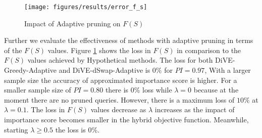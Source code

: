 
\begin{figure}[t]
	\texttt{[image: figures/results/error\_f\_s]}
				\vspace{-15pt}
	\caption{Impact of Adaptive pruning on $F(S)$}
	\label{fig:pruning_performance_swapd}
\end{figure}

Further we evaluate the effectiveness of methods with adaptive pruning in terms of the $F\left(S\right)$ values. 
Figure \ref{fig:pruning_performance_swapd} shows the loss in $F\left(S\right)$ in comparison to the $F\left(S\right)$ values achieved by Hypothetical methods. The loss for both DiVE-Greedy-Adaptive and DiVE-dSwap-Adaptive is $0\%$ for $PI=0.97$, With a larger sample size the accuracy of approximated importance score is higher. For a smaller sample size of $PI=0.80$ there is 0\% loss while $\lambda = 0$ because at the moment there are no pruned queries. However, there is a maximum loss of $10\%$ at $\lambda= 0.1$. The loss in $F\left(S\right)$ values decrease as $\lambda$ increases as the impact of importance score becomes smaller in the hybrid objective function. Meanwhile, starting $\lambda \geq 0.5$ the loss is 0\%.


